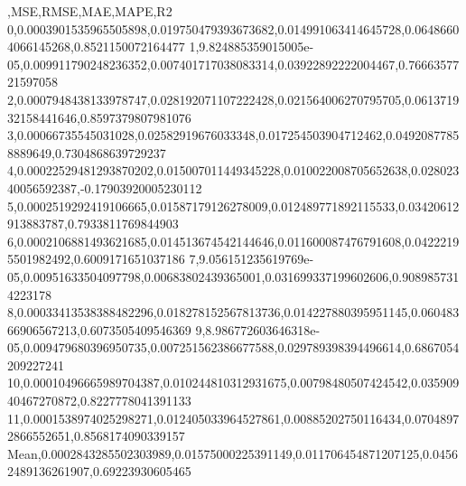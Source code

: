 ,MSE,RMSE,MAE,MAPE,R2
0,0.0003901535965505898,0.019750479393673682,0.014991063414645728,0.06486604066145268,0.8521150072164477
1,9.824885359015005e-05,0.009911790248236352,0.007401717038083314,0.03922892222004467,0.7666357721597058
2,0.0007948438133978747,0.028192071107222428,0.021564006270795705,0.061371932158441646,0.8597379807981076
3,0.00066735545031028,0.02582919676033348,0.017254503904712462,0.04920877858889649,0.7304868639729237
4,0.00022529481293870202,0.015007011449345228,0.010022008705652638,0.02802340056592387,-0.17903920005230112
5,0.0002519292419106665,0.01587179126278009,0.012489771892115533,0.03420612913883787,0.7933811769844903
6,0.0002106881493621685,0.014513674542144646,0.011600087476791608,0.04222195501982492,0.6009171651037186
7,9.056151235619769e-05,0.00951633504097798,0.00683802439365001,0.031699337199602606,0.9089857314223178
8,0.00033413538388482296,0.018278152567813736,0.014227880395951145,0.06048366906567213,0.6073505409546369
9,8.986772603646318e-05,0.009479680396950735,0.007251562386677588,0.029789398394496614,0.6867054209227241
10,0.00010496665989704387,0.010244810312931675,0.00798480507424542,0.03590940467270872,0.8227778041391133
11,0.0001538974025298271,0.012405033964527861,0.00885202750116434,0.07048972866552651,0.8568174090339157
Mean,0.0002843285502303989,0.01575000225391149,0.011706454871207125,0.04562489136261907,0.69223930605465

